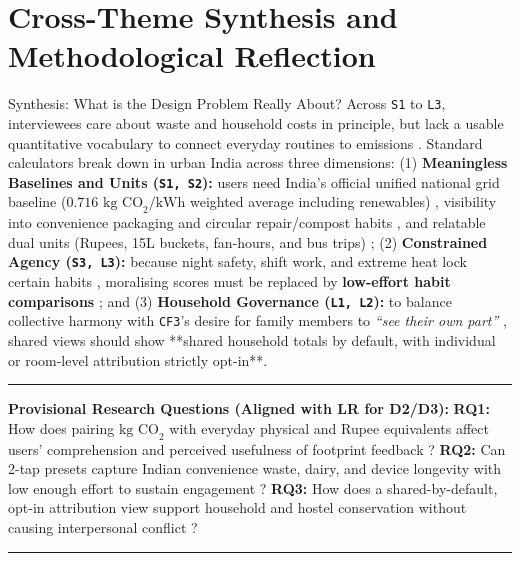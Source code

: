 \documentclass[12pt, a4paper]{article}
\begin{document}
\section{Cross-Theme Synthesis and Methodological Reflection}
\begin{synthesisbox}{Synthesis: What is the Design Problem Really About?}
Across \texttt{S1} to \texttt{L3}, interviewees care about waste and household costs in principle, but lack a usable quantitative vocabulary to connect everyday routines to emissions \cite{khandelwal2019}. Standard calculators break down in urban India across three dimensions: (1) \textbf{Meaningless Baselines and Units (\texttt{S1, S2}):} users need India's official unified national grid baseline (\textbf{$0.716\text{ kg CO}_2/\text{kWh}$} weighted average including renewables) \cite{cea2023}, visibility into convenience packaging and circular repair/compost habits \cite{liu2020, cf1, cf3, cf4, cf10}, and relatable dual units (Rupees, 15L buckets, fan-hours, and bus trips) \cite{cf1, cf6, cf8}; (2) \textbf{Constrained Agency (\texttt{S3, L3}):} because night safety, shift work, and extreme heat lock certain habits \cite{brynjarsdottir2012, hoffmann2024, cf1, cf9}, moralising scores must be replaced by \textbf{low-effort habit comparisons} \cite{froehlich2010, cf5, cf6}; and (3) \textbf{Household Governance (\texttt{L1, L2}):} to balance collective harmony with \texttt{CF3}'s desire for family members to \textit{``see their own part''} \cite{cf3}, shared views should show **shared household totals by default, with individual or room-level attribution strictly opt-in**.
\vspace{2pt}\hrule\vspace{3pt}
\textbf{Provisional Research Questions (Aligned with LR for D2/D3):} \textbf{RQ1:} How does pairing $\text{kg CO}_2$ with everyday physical and Rupee equivalents affect users' comprehension and perceived usefulness of footprint feedback \cite{grinstein2018, mohanty2023, cf1, cf6, cf8}? \textbf{RQ2:} Can 2-tap presets capture Indian convenience waste, dairy, and device longevity with low enough effort to sustain engagement \cite{froehlich2010, hoffmann2024, cf1, cf10}? \textbf{RQ3:} How does a shared-by-default, opt-in attribution view support household and hostel conservation without causing interpersonal conflict \cite{tiefenbeck2018, cf3, cf7, cf10}?
\vspace{2pt}\hrule\vspace{3pt}

\end{synthesisbox}
\end{document}
